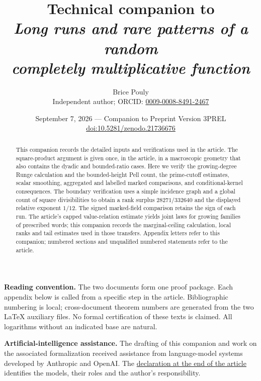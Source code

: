 \documentclass[11pt,a4paper]{article}
\title{\textbf{Technical companion to}\\[2mm]
\large\emph{Long runs and rare patterns of a random\\completely multiplicative function}}
\author{Brice Pouly\\[1mm]\small Independent author; ORCID:
\href{https://orcid.org/0009-0008-8491-2467}{0009-0008-8491-2467}}
\date{September 7, 2026 --- Companion to Preprint Version 3PREL\\[.3em]
\small\href{https://doi.org/10.5281/zenodo.21736676}{doi:10.5281/zenodo.21736676}}
\begin{document}
\maketitle
\begin{abstract}
This companion records the detailed inputs and verifications used in the
article. The square-product argument is given once, in the article, in a
macroscopic geometry that also contains the dyadic and bounded-ratio cases.
Here we verify the growing-degree Runge calculation and the bounded-height
Pell count, the prime-cutoff estimates, scalar smoothing, aggregated and labelled marked comparisons, and conditional-kernel consequences. The boundary verification uses a
simple incidence graph and a global count of square divisibilities to obtain
a rank surplus $28271/332640$ and the displayed relative exponent $1/12$.
The signed marked-field comparison retains the sign of each run. The
article's capped value-relation estimate yields joint laws for growing
families of prescribed words; this companion records the marginal-ceiling
calculation, local ranks and tail estimates used in those transfers. Appendix letters refer to this companion;
numbered sections and unqualified numbered statements refer to the article.
\end{abstract}
\medskip
\noindent\textbf{Reading convention.} The two documents form one proof package.
Each appendix below is called from a specific step in the article. Bibliographic
numbering is local; cross-document theorem numbers are generated from the two
LaTeX auxiliary files. No formal certification of these texts is claimed. All logarithms without an indicated base are natural.
\par\medskip
\noindent\textbf{Artificial-intelligence assistance.} The drafting of this
companion and work on the associated formalization received assistance
from language-model systems developed by Anthropic and OpenAI. The
\hyperref[sec:ai-assistance]{declaration at the end of the article}
identifies the models, their roles and the author's responsibility.
\tableofcontents
\clearpage

\clearpage

\clearpage
\appendix





\clearpage

\end{document}
